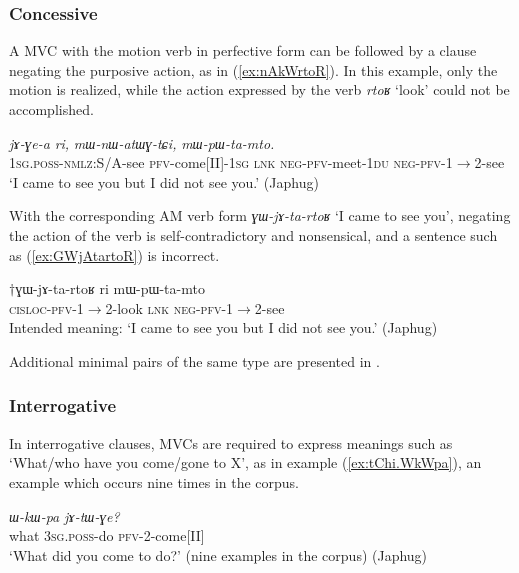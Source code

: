 \documentclass[oneside,a4paper,11pt]{article}
\newcommand{\ipa}[1]{{\phon\textit{#1}}}
\newcommand{\japhug}[2]{\textit{\phon#1} `#2'}
\newcommand{\fl}{$\rightarrow$}
\begin{document}
\subsubsection{Concessive} \label{sec:am.concessive}
A MVC  with the motion verb in perfective form can be followed by a clause negating the purposive action, as in (\ref{ex:nAkWrtoR}). In this example, only the motion is realized, while the action expressed by the verb \japhug{rtoʁ}{look} could not be accomplished.

\begin{exe}
\ex \label{ex:nAkWrtoR}
\gll \ipa{nɤ-kɯ-rtoʁ}	\ipa{jɤ-ɣe-a}	\ipa{ri,}	\ipa{mɯ-nɯ-atɯɣ-tɕi,}	\ipa{mɯ-pɯ-ta-mto.} \\
\textsc{1sg.poss}-\textsc{nmlz}:S/A-see \textsc{pfv}-come[II]-\textsc{1sg} \textsc{lnk} \textsc{neg}-\textsc{pfv}-meet-\textsc{1du} \textsc{neg}-\textsc{pfv}-1\fl2-see \\
\glt `I came to see you but I did not see you.' (Japhug)
\end{exe}

With the corresponding AM verb form \japhug{ɣɯ-jɤ-ta-rtoʁ}{I came to see you}, negating the action of the verb is self-contradictory and nonsensical, and a sentence such as (\ref{ex:GWjAtartoR}) is incorrect.

\begin{exe}
\ex \label{ex:GWjAtartoR}
\gll $\dagger$ɣɯ-jɤ-ta-rtoʁ ri mɯ-pɯ-ta-mto \\
\textsc{cisloc}-\textsc{pfv}-1\fl2-look \textsc{lnk} \textsc{neg}-\textsc{pfv}-1\fl2-see \\
\glt Intended meaning: `I came to see you but I did not see you.'  (Japhug)
\end{exe}

Additional minimal pairs of the same type are presented in \citet[202-203]{jacques13harmonization}.


\subsubsection{Interrogative} \label{sec:am.interrogative}
In interrogative clauses, MVCs are required to express meanings such as `What/who have you come/gone to X', as in example (\ref{ex:tChi.WkWpa}), an example which occurs nine times in the corpus.

\begin{exe}
\ex \label{ex:tChi.WkWpa}
\gll \ipa{tɕʰi}	\ipa{ɯ-kɯ-pa}	\ipa{jɤ-tɯ-ɣe?}\\
what \textsc{3sg.poss}-do \textsc{pfv}-2-come[II] \\
\glt `What did you come to do?' (nine examples in the corpus) (Japhug)
\end{exe}
\end{document}
